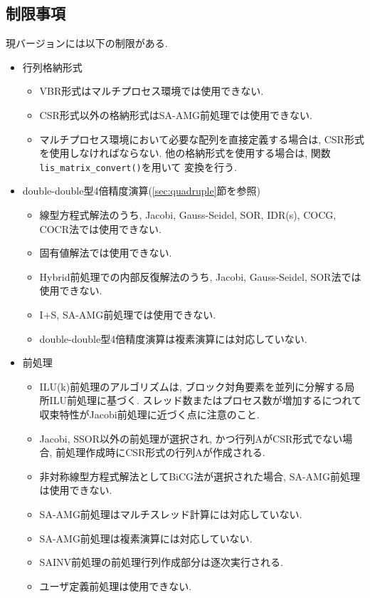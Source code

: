 \documentclass[a4paper]{jarticle}
\begin{document}
{{\subsection{制限事項}
現バージョンには以下の制限がある. 
\begin{itemize}
\item 行列格納形式
\begin{itemize}
\item VBR形式はマルチプロセス環境では使用できない. 
\item CSR形式以外の格納形式はSA-AMG前処理では使用できない. 
\item マルチプロセス環境において必要な配列を直接定義する場合は, CSR形式
      を使用しなければならない.
      他の格納形式を使用する場合は, 関数\verb|lis_matrix_convert()|を用いて
      変換を行う. 
\end{itemize}

\item double-double型4倍精度演算(\ref{sec:quadruple}節を参照)
\begin{itemize}
\item 線型方程式解法のうち, Jacobi, Gauss-Seidel, SOR, IDR(s), COCG, COCR法では使用できない.
\item 固有値解法では使用できない.
\item Hybrid前処理での内部反復解法のうち, Jacobi, Gauss-Seidel, SOR法では使用できない.
\item I+S, SA-AMG前処理では使用できない.
\item double-double型4倍精度演算は複素演算には対応していない.
\end{itemize}

\item 前処理
\begin{itemize}
\item ILU(k)前処理のアルゴリズムは, ブロック対角要素を並列に分解する局所ILU前処理\cite{nakajima}に基づく. スレッド数またはプロセス数が増加するにつれて収束特性がJacobi前処理に近づく点に注意のこと.
\item Jacobi, SSOR以外の前処理が選択され, かつ行列AがCSR形式でない場合,
      前処理作成時にCSR形式の行列Aが作成される.
\item 非対称線型方程式解法としてBiCG法が選択された場合, SA-AMG前処理は使用できない.
\item SA-AMG前処理はマルチスレッド計算には対応していない.
\item SA-AMG前処理は複素演算には対応していない.   
\item SAINV前処理の前処理行列作成部分は逐次実行される.
\item ユーザ定義前処理は使用できない.
\end{itemize}


\end{itemize}}}
\end{document}
